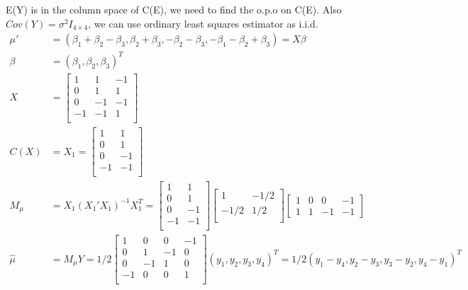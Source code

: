 \begin{itemize}
E(Y) is in the column space of C(E), we need to find the o.p.o on C(E). Also $Cov(Y) = \sigma^2 I_{4 \times 4}$, we can use ordinary least squares estimator as i.i.d.
\begin{align*}
    \mu' &= (\beta_1 + \beta_2 - \beta_3, \beta_2 + \beta_3, -\beta_2 - \beta_3, -\beta_1-\beta_2 + \beta_3) = X \beta\\
    \beta &= (\beta_1, \beta_2, \beta_3)^T\\
    X &= \begin{bmatrix}
           1  & 1 & -1  \\
           0 &  1 & 1\\
           0  & -1 & -1  \\
           -1 &  -1 & 1\\
         \end{bmatrix}\\
    C(X) &= X_1 = \begin{bmatrix}
           1  & 1   \\
           0 &  1 \\
           0  & -1  \\
           -1 &  -1 \\
         \end{bmatrix}\\
    M_{\mu} &= X_1(X_1'X_{1})^{-1} X_{1}^T = \begin{bmatrix}
           1  & 1   \\
           0 &  1 \\
           0  & -1  \\
           -1 &  -1 \\
         \end{bmatrix}\begin{bmatrix}
           1  & -1/2   \\
           -1/2 &  1/2 \\
         \end{bmatrix}\begin{bmatrix}
           1 & 0 & 0 & -1    \\
           1 & 1 & -1 & -1
         \end{bmatrix}\\
       \hat{\mu} &= M_{\mu} Y =  1/2 \begin{bmatrix}
           1  & 0 & 0 & -1   \\
           0 &  1 & -1 & 0 \\
           0  & -1 & 1 & 0 \\
           -1 &  0 & 0 & 1 \\
         \end{bmatrix} (y_1, y_2, y_3, y_4)^T = 1/2 (y_1- y_4, y_2-y_3, y_3-y_2, y_4-y_1)^T
\end{align*}


\end{itemize}

